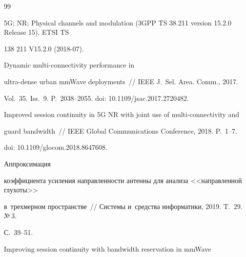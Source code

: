  {\small\frenchspacing


{%




\begin{thebibliography}{99}




5G; NR; Physical channels and modulation (3GPP TS 38.211 version 15.2.0 Release 15). ETSI TS 


138 211 V15.2.0 (2018-07).







 Dynamic multi-connectivity performance in 


ultra-dense urban mmWave deployments~/\!\!/ IEEE J.~Sel. Area. Comm., 2017. 


Vol.~35. Iss.~9. P.~2038--2055. doi: 10.1109\!/\!jsac.2017.2720482.







 Improved session continuity in 5G NR with joint use of multi-connectivity and 


guard bandwidth~/\!\!/ IEEE Global Communications Conference, 2018. P.~1--7. 


doi: 10.1109\!/\!glocom.2018.8647608.







 Аппроксимация 


коэффициента усиления направленности антенны для анализа <<направленной глухоты>> 


в~трехмерном пространстве~/\!\!/ Системы и~средства информатики, 2019. T.~29. №\,3. 


С.~39--51.




 Improving session continuity with bandwidth reservation in mmWave 



\end{thebibliography}}}
